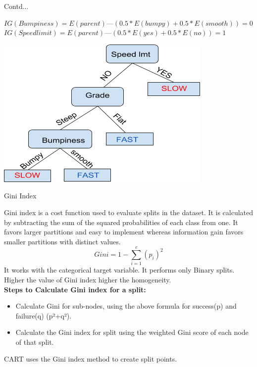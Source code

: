 \documentclass{beamer}
\begin{document}
\begin{frame}{Contd...}
\begin{flushleft}
	$ IG(Bumpiness) = E(parent) — (0.5 * E(bumpy) + 0.5 * E(smooth)) = 0 $ \\
	$ IG(Speed limit) = E(parent) — (0.5 * E(yes) + 0.5 * E(no)) = 1 $
	\end{flushleft}
	\includegraphics[scale=0.5]{DT_Car_example}
\end{frame}

\begin{frame}{Gini Index}
\begin{flushleft}
	 Gini index is a cost function used to evaluate splits in the dataset. It is calculated by subtracting the sum of the squared probabilities of each class from one. It favors larger partitions and easy to implement whereas information gain favors smaller partitions with distinct values.
		\begin{equation*}
			Gini = 1 - \sum_{i=1}^{c}(p_i)^2
		\end{equation*}
It works with the categorical target variable. It performs only Binary splits. Higher the value of Gini index higher the homogeneity.
\\
\vspace{10pt}
\textbf{Steps to Calculate Gini index for a split:}
\begin{itemize}
	\item Calculate Gini for sub-nodes, using the above formula for success(p) and failure(q) (p²+q²).
	\item Calculate the Gini index for split using the weighted Gini score of each node of that split.
\end{itemize}
CART uses the Gini index method to create split points.
	\end{flushleft}
\end{frame}
\end{document}
